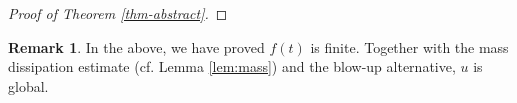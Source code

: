 \documentclass[10pt%
]{amsart}
\numberwithin{equation}{section}
\theoremstyle{definition}
\newtheorem{remark}[theorem]{Remark}
\begin{document}
\begin{proof}[Proof of Theorem \ref{thm-abstract}]
    
	
	
\end{proof}

\begin{remark}
	In the above, we have proved $f(t)$ is finite. Together with the mass dissipation estimate (cf. Lemma \ref{lem:mass}) and the blow-up alternative, $u$ is global.
\end{remark}
\end{document}
